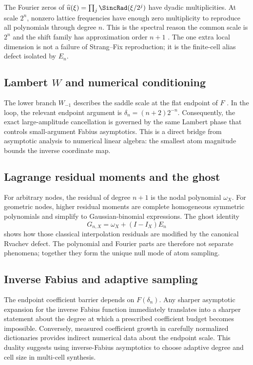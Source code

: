 \documentclass[11pt,oneside]{article}
\theoremstyle{definition}
\theoremstyle{remark}
\newcommand{\1}{\mathbf{1}}
\begin{document}
The Fourier zeros of
$\widehat u(\xi)=\prod_j\SincRad(\xi/2^j)$ have dyadic multiplicities.  At scale
$2^n$, nonzero lattice frequencies have enough zero multiplicity to reproduce
all polynomials through degree $n$.  This is the spectral reason the common
scale is $2^n$ and the shift family has approximation order $n+1$
\cite{StrangFix,deBoorRon,UpSynthesisRepo}.  The one
extra local dimension is not a failure of Strang--Fix reproduction; it is the
finite-cell alias defect isolated by $E_n$.

\subsection{Lambert \texorpdfstring{$W$}{W} and numerical conditioning}

The lower branch $W_{-1}$ describes the saddle scale at the flat endpoint of
$F$ \cite{Corless1996,PrimaryRepo}.  In the loop, the relevant endpoint argument is
$\delta_n=(n+2)2^{-n}$.  Consequently, the exact large-amplitude cancellation
is governed by the same Lambert phase that controls small-argument Fabius
asymptotics.  This is a direct bridge from asymptotic analysis to numerical
linear algebra: the smallest atom magnitude bounds the inverse coordinate
map.

\subsection{Lagrange residual moments and the ghost}

For arbitrary nodes, the residual of degree $n+1$ is the nodal polynomial
$\omega_X$.  For geometric nodes, higher residual moments are complete
homogeneous symmetric polynomials and simplify to Gaussian-binomial
expressions.  The ghost identity
\[
 G_{n,X}=\omega_X+(I-I_X)E_n
\]
shows how those classical interpolation residuals are modified by the
canonical Rvachev defect.  The polynomial and Fourier parts are therefore not
separate phenomena; together they form the unique null mode of atom sampling.

\subsection{Inverse Fabius and adaptive sampling}

The endpoint coefficient barrier depends on $F(\delta_n)$.  Any sharper
asymptotic expansion for the inverse Fabius function immediately translates
into a sharper statement about the degree at which a prescribed coefficient
budget becomes impossible.  Conversely, measured coefficient growth in
carefully normalized dictionaries provides indirect numerical data about the
endpoint scale.  This duality suggests using inverse-Fabius asymptotics to
choose adaptive degree and cell size in multi-cell synthesis.
\end{document}
